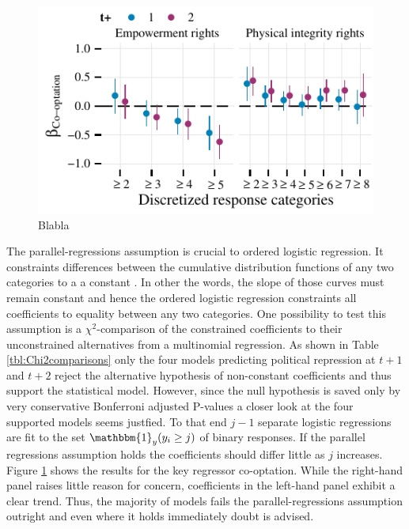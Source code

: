 \begin{figure}
\centering
\includegraphics[width=\linewidth]{./sections/03replication/parallelRegressionsCoefPlot.pdf}
\caption{Blabla}
\label{fig:separateLogisticCoef}
\end{figure}
The parallel-regressions assumption is crucial to 
ordered logistic regression. It constraints differences 
between the cumulative distribution functions of any two 
categories to a a constant \citep[476]{Fox.2008}. In other 
the words, the slope of those curves must remain constant 
and hence the ordered logistic regression constraints all 
coefficients to equality between any two categories. One 
possibility to test this assumption is a $\chi^2$-comparison
of the constrained coefficients to their unconstrained 
alternatives from a multinomial regression. As shown in 
Table \ref{tbl:Chi2comparisons} only the four models 
predicting political repression at $t+1$ and $t+2$ reject 
the alternative hypothesis of non-constant coefficients and
thus support the statistical model. However, since the null 
hypothesis is saved only by very conservative Bonferroni 
adjusted P-values a closer look at the four supported
models seems justfied. To that end $j-1$ separate logistic 
regressions are fit to the set $\mathbbm{1}_y(y_{i} \ge j)$
of binary responses. If the parallel regressions 
assumption holds the coefficients should differ little as 
$j$ increases. Figure \ref{fig:separateLogisticCoef} shows 
the results for the key regressor co-optation. While the 
right-hand panel raises little reason for concern, 
coefficients in the left-hand panel exhibit a clear trend. 
Thus, the majority of models fails the parallel-regressions 
assumption outright and even where it holds immediately doubt
is advised.






